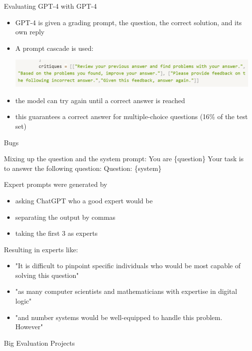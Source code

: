 \begin{vbframe}{Evaluating GPT-4 with GPT-4}
	\vfill

	\begin{itemize}
		\item GPT-4 is given a grading prompt, the question, the correct solution, and its own reply
		\item A prompt cascade is used:

		\includegraphics[width=\textwidth]{evaluation_figures/critiques.png}

		\item the model can try again until a correct answer is reached
		\item this guarantees a correct answer for multiple-choice questions (16\% of the test set)
	\end{itemize}
\end{vbframe}

\begin{vbframe}{Bugs}

Mixing up the question and the system prompt:
You are \{question\} Your task is to answer the following question: Question: \{system\}

Expert prompts were generated by
\begin{itemize}
	\item asking ChatGPT who a good expert would be 
	\item separating the output by commas
	\item taking the first 3 as experts
\end{itemize}
Resulting in experts like:
\begin{itemize}
	\item "It is difficult to pinpoint specific individuals who would be most capable of solving this question"
	\item "as many computer scientists and mathematicians with expertise in digital logic"
	\item "and number systems would be well-equipped to handle this problem. However"
\end{itemize}
\end{vbframe}


\begin{vbframe}{Big Evaluation Projects}



\end{vbframe}


